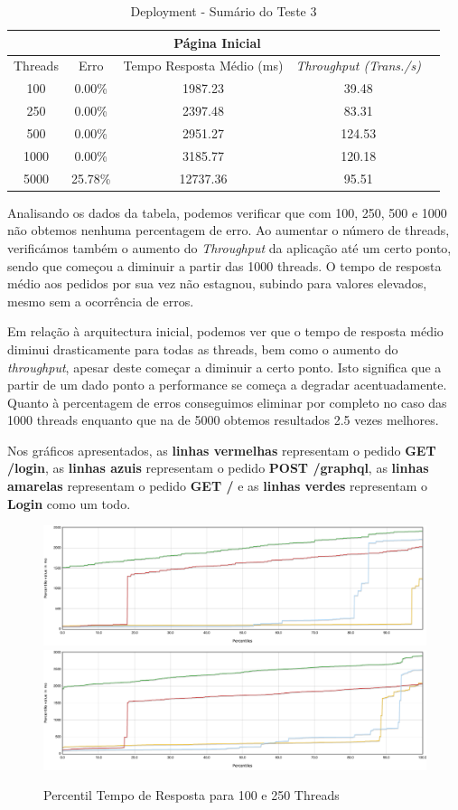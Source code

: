 \begin{table}[h!]
\centering
    \begin{tabular}{ |c|c|c|c|c|  }
        \hline
        \multicolumn{4}{|c|}{Página Inicial} \\
        \hline
         Threads & Erro & Tempo Resposta Médio (ms) & \textit{Throughput (Trans./s)}\\
        \hline
        100   & 0.00\%   & 1987.23  & 39.48\\
        250   & 0.00\%   & 2397.48  & 83.31\\
        500   & 0.00\%   & 2951.27 & 124.53\\
        1000  & 0.00\%   & 3185.77 & 120.18\\
        5000  & 25.78\%  & 12737.36 & 95.51\\
        \hline
    \end{tabular}
    \caption{Deployment - Sumário do Teste 3}
    \label{table:1}
\end{table}

Analisando os dados da tabela, podemos verificar que com 100, 250, 500 e 1000 não obtemos nenhuma percentagem de erro. Ao aumentar o número de threads, verificámos também o aumento do \textit{Throughput} da aplicação até um certo ponto, sendo que começou a diminuir a partir das 1000 threads. O tempo de resposta médio aos pedidos por sua vez não estagnou, subindo para valores elevados, mesmo sem a ocorrência de erros.

Em relação à arquitectura inicial, podemos ver que o tempo de resposta médio diminui drasticamente para todas as threads, bem como o aumento do \textit{throughput}, apesar deste começar a diminuir a certo ponto. Isto significa que a partir de um dado ponto a performance se começa a degradar acentuadamente. Quanto à percentagem de erros conseguimos eliminar por completo no caso das 1000 threads enquanto que na de 5000 obtemos resultados 2.5 vezes melhores. 

Nos gráficos apresentados, as \textbf{linhas vermelhas} representam o pedido \textbf{GET /login}, as \textbf{linhas azuis} representam o pedido \textbf{POST /graphql}, as \textbf{linhas amarelas} representam o pedido \textbf{GET /} e as \textbf{linhas verdes} representam o \textbf{Login} como um todo.


\begin{figure}[ht!]
    \centering
    \includegraphics[width=.45\linewidth]{img/testes/i2-t3-100.png}
    \includegraphics[width=.45\linewidth]{img/testes/i2-t3-250.png}
    \caption{Percentil Tempo de Resposta para 100 e 250 Threads}
\end{figure}

